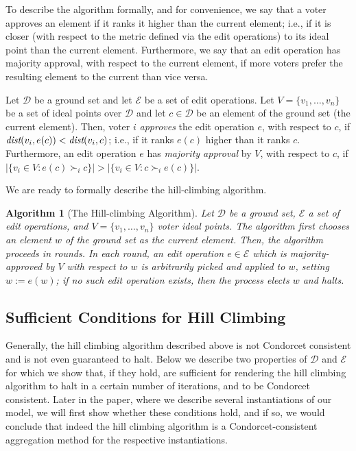 \documentclass[sigconf]{aamas}  %
\newtheorem{algorithm}{Algorithm}
\newcommand{\calD}{\mathcal{D}}
\newcommand{\calE}{\mathcal{E}}
\newcommand{\prefers}[1]{\succ_{#1}}
\newcommand{\dist}{\emph{dist}}
\begin{document}
To describe the algorithm formally, and for convenience,
we say that a voter approves an element if it ranks it higher than the current element; i.e., if it is closer (with respect to the metric defined via the edit operations) to its ideal point than the current element.
Furthermore, we say that an edit operation has majority approval, with respect to the current element, if more voters prefer the resulting element to the current than vice versa.

\begin{definition}
%
Let $\calD$ be a ground set and let $\calE$ be a set of edit operations.
Let $V = \{v_1, \ldots, v_n\}$ be a set of ideal points over $\calD$ and let $c \in \calD$ be an element of the ground set (the current element).
Then, voter $i$ \emph{approves} the edit operation $e$, with respect to $c$, if $\dist(v_i, e(c)) < \dist(v_i, c)$; i.e., if it ranks $e(c)$ higher than it ranks $c$.
Furthermore, an edit operation $e$ has \emph{majority approval} by $V$, with respect to $c$, if $|\{v_i \in V : e(c) \prefers{i} c\}| > |\{v_i \in V : c \prefers{i} e(c)\}|$.
%
\end{definition}

We are ready to formally describe the hill-climbing algorithm.

\begin{algorithm}[The Hill-climbing Algorithm]
%
Let $\calD$ be a ground set,
$\calE$ a set of edit operations,
and $V = \{v_1, \ldots, v_n\}$ voter ideal points.
The algorithm first chooses an element $w$ of the ground set as the \emph{current element}.
Then, the algorithm proceeds in rounds.
In each round, an edit operation $e \in \calE$ which is majority-approved by $V$ with respect to $w$ is arbitrarily picked and applied to $w$, setting $w := e(w)$;
if no such edit operation exists, then the process elects $w$ and halts.
%
\end{algorithm}


\subsection{Sufficient Conditions for Hill Climbing}

Generally,
the hill climbing algorithm described above is not Condorcet consistent and is not even guaranteed to halt.
Below we describe two properties of $\calD$ and $\calE$ for which we show that, if they hold, are sufficient for rendering the hill climbing algorithm to halt in a certain number of iterations,
and to be Condorcet consistent. Later in the paper, where we describe several instantiations of our model,
we will first show whether these conditions hold, and if so, we would conclude that indeed the hill climbing algorithm is a Condorcet-consistent aggregation method for the respective instantiations.
\end{document}
